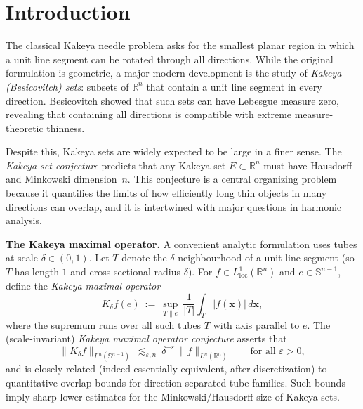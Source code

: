 \documentclass[11pt]{article}
\newcommand{\1}{\mathbf 1}
\begin{document}
\section{Introduction}


The classical Kakeya needle problem asks for the smallest planar region in which a unit line
segment can be rotated through all directions. While the original formulation is geometric, a major modern development is the study of \emph{Kakeya (Besicovitch) sets}:
subsets of $\mathbb{R}^n$ that contain a unit line segment in every direction. Besicovitch \cite{Besicovitch1928}
showed that such sets can have Lebesgue measure zero, revealing that containing all
directions is compatible with extreme measure-theoretic thinness.

Despite this, Kakeya sets are widely expected to be large in a finer sense. The
\emph{Kakeya set conjecture} predicts that any Kakeya set $E\subset\mathbb{R}^n$ must have
Hausdorff and Minkowski dimension~$n$. This conjecture is a central organizing problem because
it quantifies the limits of how efficiently long thin objects in many directions can overlap,
and it is intertwined with major questions in harmonic analysis.

\medskip
\noindent\textbf{The Kakeya maximal operator.}
A convenient analytic formulation uses tubes at scale $\delta\in(0,1)$. Let $T$ denote the
$\delta$-neighbourhood of a unit line segment (so $T$ has length $1$ and cross-sectional
radius $\delta$). For $f\in L^1_{\mathrm{loc}}(\mathbb{R}^n)$ and $e\in\mathbb{S}^{n-1}$,
define the \emph{Kakeya maximal operator}
\begin{equation}\label{eq:euclid-kakeya-max}
K_\delta f(e)\ :=\ \sup_{T\parallel e}\ \frac{1}{|T|}\int_T |f(\mathbf{x})|\,d \mathbf{x},
\end{equation}
where the supremum runs over all such tubes $T$ with axis parallel to $e$.
The (scale-invariant) \emph{Kakeya maximal operator conjecture} asserts that
\begin{equation}\label{eq:euclid-kakeya-conj}
\|K_\delta f\|_{L^n(\mathbb{S}^{n-1})}\ \lesssim_{\varepsilon,n}\ \delta^{-\varepsilon}\,
\|f\|_{L^n(\mathbb{R}^n)}\qquad\text{for all }\varepsilon>0,
\end{equation}
and is closely related (indeed essentially equivalent, after discretization) to quantitative
overlap bounds for direction-separated tube families. Such bounds imply sharp lower estimates
for the Minkowski/Hausdorff size of Kakeya sets.
\end{document}
